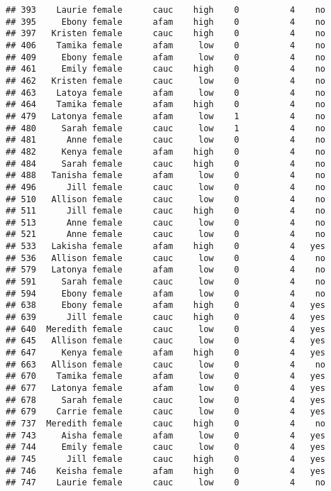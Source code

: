 \documentclass[
]{article}
\begin{document}
\begin{verbatim}
## 393    Laurie female      cauc    high    0          4    no
## 395     Ebony female      afam    high    0          4    no
## 397   Kristen female      cauc    high    0          4    no
## 406    Tamika female      afam     low    0          4    no
## 409     Ebony female      afam     low    0          4    no
## 461     Emily female      cauc    high    0          4    no
## 462   Kristen female      cauc     low    0          4    no
## 463    Latoya female      afam     low    0          4    no
## 464    Tamika female      afam    high    0          4    no
## 479   Latonya female      afam     low    1          4    no
## 480     Sarah female      cauc     low    1          4    no
## 481      Anne female      cauc     low    0          4    no
## 482     Kenya female      afam    high    0          4    no
## 484     Sarah female      cauc    high    0          4    no
## 488   Tanisha female      afam     low    0          4    no
## 496      Jill female      cauc     low    0          4    no
## 510   Allison female      cauc     low    0          4    no
## 511      Jill female      cauc    high    0          4    no
## 513      Anne female      cauc     low    0          4    no
## 521      Anne female      cauc     low    0          4    no
## 533   Lakisha female      afam    high    0          4   yes
## 536   Allison female      cauc     low    0          4    no
## 579   Latonya female      afam     low    0          4    no
## 591     Sarah female      cauc     low    0          4    no
## 594     Ebony female      afam     low    0          4    no
## 638     Ebony female      afam    high    0          4   yes
## 639      Jill female      cauc    high    0          4   yes
## 640  Meredith female      cauc     low    0          4   yes
## 645   Allison female      cauc     low    0          4   yes
## 647     Kenya female      afam    high    0          4   yes
## 663   Allison female      cauc     low    0          4    no
## 670    Tamika female      afam     low    0          4   yes
## 677   Latonya female      afam     low    0          4   yes
## 678     Sarah female      cauc     low    0          4   yes
## 679    Carrie female      cauc     low    0          4   yes
## 737  Meredith female      cauc    high    0          4    no
## 743     Aisha female      afam     low    0          4   yes
## 744     Emily female      cauc     low    0          4   yes
## 745      Jill female      cauc    high    0          4   yes
## 746    Keisha female      afam    high    0          4   yes
## 747    Laurie female      cauc     low    0          4    no

\end{verbatim}
\end{document}

